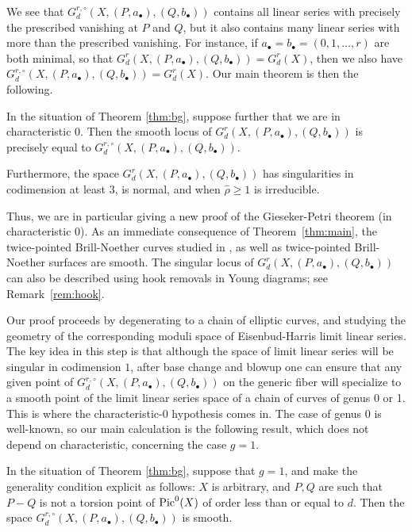 \documentclass{amsart}
\begin{document}
We see that $G^{r,\circ}_d(X,(P,a_{\bullet}),(Q,b_{\bullet}))$ 
contains all linear
series with precisely the prescribed vanishing at $P$ and $Q$, but it
also contains many linear series with more than the prescribed vanishing.
For instance, if $a_{\bullet} = b_{\bullet} = (0,1,\ldots,r)$ are both minimal, so that
$G^r_d(X,(P,a_{\bullet}),(Q,b_{\bullet}))=G^r_d(X)$, then we also have
$G^{r,\circ}_d(X,(P,a_{\bullet}),(Q,b_{\bullet}))=G^r_d(X)$.
Our main theorem is then the following.

\begin{thm}\label{thm:main} In the situation of Theorem \ref{thm:bg}, 
suppose further that we are in characteristic $0$. Then the smooth locus of
$G^r_d(X,(P,a_{\bullet}),(Q,b_{\bullet}))$ is precisely equal to 
$G^{r,\circ}_d(X,(P,a_{\bullet}),(Q,b_{\bullet}))$. 

Furthermore, the
space $G^r_d(X,(P,a_{\bullet}),(Q,b_{\bullet}))$ has singularities in 
codimension at least $3$, is normal, and when $\widehat{\rho} \geq 1$
is irreducible.
\end{thm}

Thus, we are in particular giving a new proof of the Gieseker-Petri
theorem (in characteristic $0$).
As an immediate consequence of Theorem~\ref{thm:main}, the twice-pointed Brill-Noether curves studied in \cite{c-l-p-t1}, as well as twice-pointed Brill-Noether surfaces \cite{c-p3, a-c-t1} are smooth.
The singular locus of $G^r_d(X,(P,a_{\bullet}),(Q,b_{\bullet}))$ can also be described using hook removals in Young diagrams; see Remark~\ref{rem:hook}.

Our proof proceeds by degenerating to a chain of elliptic curves,
and studying the geometry of the corresponding moduli space of
Eisenbud-Harris limit linear series. 
The key
idea in this step is that although the space of limit linear series
will be singular in codimension $1$, after base change and blowup one can 
ensure that any given point of 
$G^{r,\circ}_d(X,(P,a_{\bullet}),(Q,b_{\bullet}))$ on the generic fiber will
specialize to a smooth point of the limit linear series space of a chain of curves of genus 0 or 1. This
is where the characteristic-$0$ hypothesis comes in. The case of genus 0 is well-known, so our main 
calculation is  the following result, which does not depend on 
characteristic, concerning the case $g=1$.

\begin{thm}\label{thm:genus-1} In the situation of Theorem \ref{thm:bg}, 
suppose that $g=1$, and make the generality condition explicit as follows:
$X$ is arbitrary, and $P,Q$ are such that $P-Q$ is not a torsion
point of $\operatorname{Pic}^0(X)$ of order less than or equal to $d$.
Then the space $G^{r,\circ}_d(X,(P,a_{\bullet}),(Q,b_{\bullet}))$ is smooth.
\end{thm}
\end{document}
